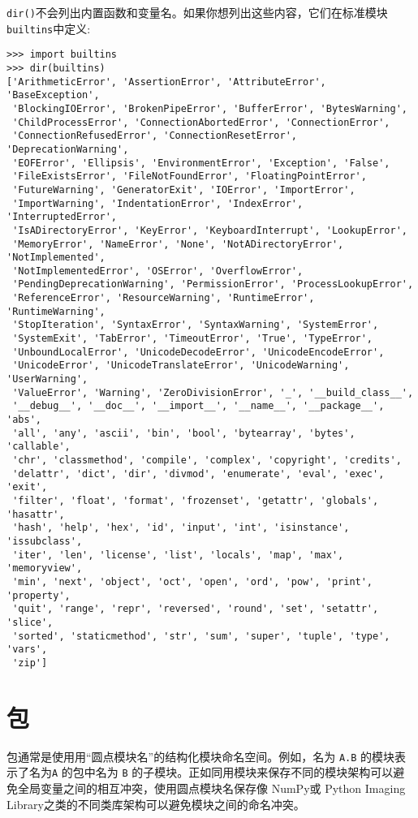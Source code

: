 \texttt{dir()}不会列出内置函数和变量名。如果你想列出这些内容，它们在标准模块 \texttt{builtins}中定义:
\begin{lstlisting}
>>> import builtins
>>> dir(builtins)
['ArithmeticError', 'AssertionError', 'AttributeError', 'BaseException',
 'BlockingIOError', 'BrokenPipeError', 'BufferError', 'BytesWarning',
 'ChildProcessError', 'ConnectionAbortedError', 'ConnectionError',
 'ConnectionRefusedError', 'ConnectionResetError', 'DeprecationWarning',
 'EOFError', 'Ellipsis', 'EnvironmentError', 'Exception', 'False',
 'FileExistsError', 'FileNotFoundError', 'FloatingPointError',
 'FutureWarning', 'GeneratorExit', 'IOError', 'ImportError',
 'ImportWarning', 'IndentationError', 'IndexError', 'InterruptedError',
 'IsADirectoryError', 'KeyError', 'KeyboardInterrupt', 'LookupError',
 'MemoryError', 'NameError', 'None', 'NotADirectoryError', 'NotImplemented',
 'NotImplementedError', 'OSError', 'OverflowError',
 'PendingDeprecationWarning', 'PermissionError', 'ProcessLookupError',
 'ReferenceError', 'ResourceWarning', 'RuntimeError', 'RuntimeWarning',
 'StopIteration', 'SyntaxError', 'SyntaxWarning', 'SystemError',
 'SystemExit', 'TabError', 'TimeoutError', 'True', 'TypeError',
 'UnboundLocalError', 'UnicodeDecodeError', 'UnicodeEncodeError',
 'UnicodeError', 'UnicodeTranslateError', 'UnicodeWarning', 'UserWarning',
 'ValueError', 'Warning', 'ZeroDivisionError', '_', '__build_class__',
 '__debug__', '__doc__', '__import__', '__name__', '__package__', 'abs',
 'all', 'any', 'ascii', 'bin', 'bool', 'bytearray', 'bytes', 'callable',
 'chr', 'classmethod', 'compile', 'complex', 'copyright', 'credits',
 'delattr', 'dict', 'dir', 'divmod', 'enumerate', 'eval', 'exec', 'exit',
 'filter', 'float', 'format', 'frozenset', 'getattr', 'globals', 'hasattr',
 'hash', 'help', 'hex', 'id', 'input', 'int', 'isinstance', 'issubclass',
 'iter', 'len', 'license', 'list', 'locals', 'map', 'max', 'memoryview',
 'min', 'next', 'object', 'oct', 'open', 'ord', 'pow', 'print', 'property',
 'quit', 'range', 'repr', 'reversed', 'round', 'set', 'setattr', 'slice',
 'sorted', 'staticmethod', 'str', 'sum', 'super', 'tuple', 'type', 'vars',
 'zip']
\end{lstlisting}
\section{包}
包通常是使用用“圆点模块名”的结构化模块命名空间。例如，名为 \texttt{A.B} 的模块表示了名为\texttt{A} 的包中名为 \texttt{B} 的子模块。正如同用模块来保存不同的模块架构可以避免全局变量之间的相互冲突，使用圆点模块名保存像 NumPy或 Python Imaging Library之类的不同类库架构可以避免模块之间的命名冲突。


